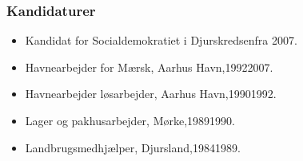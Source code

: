 \documentclass[11pt, a4paper]{awesome-cv}
\begin{document}
\begin{cvletter}
\subsubsection*{Kandidaturer}
\begin{itemize}
\item Kandidat for Socialdemokratiet i Djurskredsenfra 2007.
\end{itemize}
\begin{itemize}
\item Havnearbejder for Mærsk, Aarhus Havn,19922007.
\item Havnearbejder løsarbejder, Aarhus Havn,19901992.
\item Lager og pakhusarbejder, Mørke,19891990.
\item Landbrugsmedhjælper, Djursland,19841989.
\end{itemize}
\end{cvletter}
\end{document}
